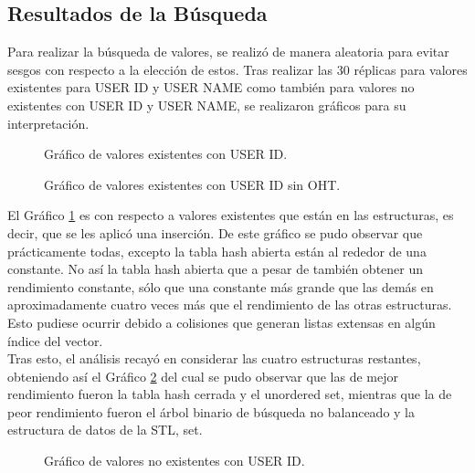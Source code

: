 \begin{multicols}{2}
\subsection{Resultados de la Búsqueda}
Para realizar la búsqueda de valores, se realizó de manera aleatoria para evitar sesgos con respecto a la elección de estos. Tras realizar las 30 réplicas para valores existentes para USER ID y USER NAME como también para valores no existentes con USER ID y USER NAME, se realizaron gráficos para su interpretación.

\begin{figure}[H]
    \centering
    
    \caption{Gráfico de valores existentes con USER ID.}
    \label{fig:valores_existentes_con_user_id}
\end{figure}

\begin{figure}[H]
    \centering
    
    \caption{Gráfico de valores existentes con USER ID sin OHT.}
    \label{fig:valores_existentes_con_user_id_sin_OHT}
\end{figure}
El Gráfico \ref{fig:valores_existentes_con_user_id} es con respecto a valores existentes que están en las estructuras, es decir, que se les aplicó una inserción. De este gráfico se pudo observar que prácticamente todas, excepto la tabla hash abierta están al rededor de una constante. No así la tabla hash abierta que a pesar de también obtener un rendimiento constante, sólo que una constante más grande que las demás en aproximadamente cuatro veces más que el rendimiento de las otras estructuras. Esto pudiese ocurrir debido a colisiones que generan listas extensas en algún índice del vector.\\
Tras esto, el análisis recayó en considerar las cuatro estructuras restantes, obteniendo así el Gráfico \ref{fig:valores_existentes_con_user_id_sin_OHT} del cual se pudo observar que las de mejor rendimiento fueron la tabla hash cerrada y el unordered set, mientras que la de peor rendimiento fueron el árbol binario de búsqueda no balanceado y la estructura de datos de la STL, set.

\begin{figure}[H]
    \centering
    
    \caption{Gráfico de valores no existentes con USER ID.}
    \label{fig:valores_no_existentes_con_user_id}
\end{figure}


\end{multicols}
